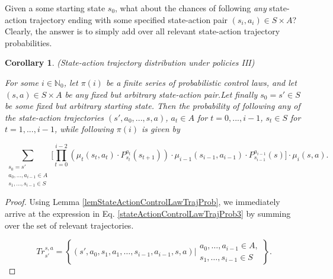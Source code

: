 \documentclass[11pt]{article} %
\newtheorem{cor}{Corollary}
\begin{document}
Given a some starting state $s_0$, what about the chances of following \textit{any} state-action trajectory ending with some specified state-action pair $(s_i,a_i) \in S \times A$? Clearly, the answer is to simply add over all relevant state-action trajectory probabilities.

\begin{cor}(State-action trajectory distribution under policies III)\label{corStateActionControlLawTrajProb2}

For some $i \in \mathbb{N}_0$, let $\pi(i)$ be a finite series of probabilistic control laws, and let $(s,a) \in S \times A$ be any fixed but arbitrary state-action pair.Let finally $s_0 = s' \in S$ be some fixed but arbitrary starting state. Then the probability of following \textit{any} of the state-action trajectories $(s',a_0,...,s,a)$, $a_t \in A$ for $t=0,...,i-1$, $s_t \in S$ for $t=1,...,i-1$, while following $\pi(i)$ is given by

\begin{equation}\label{stateActionControlLawTrajProb3}
	\sum\limits_{\begin{array}{c}
			s_0 = s' \\
			a_0,\dots,a_{i-1} \in A \\
			s_1,\dots,s_{i-1} \in S
		\end{array}}\Big[ \prod_{t=0}^{i-2} \left( \mu_t(s_t,a_t) \cdot P^{a_t}_{s_t}(s_{t+1}) \right) \cdot \mu_{i-1}(s_{i-1},a_{i-1}) \cdot P^{a_{i-1}}_{s_{i-1}}(s) \Big] \cdot \mu_i(s,a).
\end{equation}

\end{cor}

\begin{proof}

Using Lemma \ref{lemStateActionControlLawTrajProb}, we immediately arrive at the expression in Eq. \ref{stateActionControlLawTrajProb3} by summing over the set of relevant trajectories.

\begin{equation}\label{}
	Tr_{s'}^{s,a} =  \left\{(s',a_0,s_1,a_1,\dots,s_{i-1},a_{i-1},s,a) \Bigg| \begin{array}{lr}
															a_0, \dots, a_{i-1} \in A, \\
															s_1,\dots,s_{i-1} \in S
													\end{array} \right\}.
\end{equation}

\end{proof}
\end{document}
